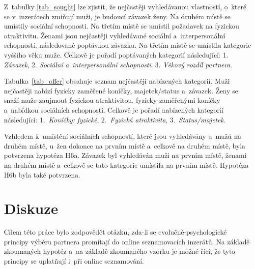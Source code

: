 \documentclass[a4paper, 12pt, notitlepage, oneside, numbers=noenddot]{report}
\begin{document}
Z~tabulky \ref{tab_sought} lze zjistit, že nejčastěji vyhledávanou
vlastností, o~které se v~inzerátech zmiňují muži, je budoucí závazek
ženy.  Na druhém místě se umístily sociální schopnosti.  Na třetím
místě se umístil požadavek na fyzickou atraktivitu.  Ženami jsou
nejčastěji vyhledávané sociální a~interpersonální schopnosti,
následované poptávkou závazku.  Na třetím místě se umístila kategorie
vyššího věku muže.  Celkově je pořadí poptávaných ka\-te\-gorií
následující: 1. \emph{Závazek}, 2. \emph{Sociální a~interpersonální
  schopnosti}, 3. \emph{Věkový rozdíl partnera}.


Tabulka~\ref{tab_offer} obsahuje seznam nejčastěji nabízených
kategorií.  Muži nejčastěji nabízí fyzicky zaměřené koníčky,
majetek/status a~závazek.  Ženy se snaží muže zaujmout fy\-zickou
atraktivitou, fyzicky zaměřenými koníčky a~nabídkou sociálních
schopností.  Celkově je pořadí nabízených kategorií následující:
1.~\emph{Koníčky: fyzické}, 2.~\emph{Fyzická atraktivita},
3.~\emph{Status/majetek}.

Vzhledem k~umístění sociálních schopností, které jsou vyhledávány
u~mužů na druhém místě, u~žen dokonce na prvním místě a~celkově na
druhém místě, byla potvrzena hypotéza H6a.  Závazek byl vyhledáván muži
na prvním místě, ženami na druhém místě a~celkově se tato kategorie
umístila na prvním místě.  Hypotéza H6b byla také potvrzena.

\section[Diskuze]{Diskuze}

Cílem této práce bylo zodpovědět otázku, zda-li se
evolučně-psychologické principy výběru partnera promítají do online
seznamovacích inzerátů.  Na základě zkoumaných hypotéz a~na základě
zkoumaného vzorku je možné říci, že tyto principy se uplatňují i~při
online seznamování.
\end{document}
